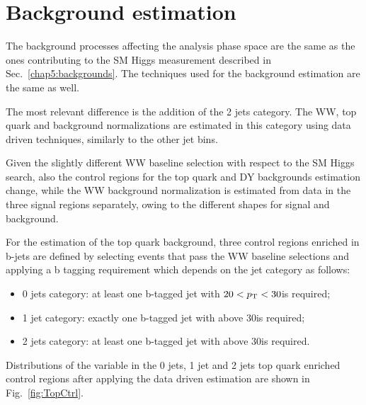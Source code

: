 \section{Background estimation}\label{chap6:Backgrounds}

The background processes affecting the analysis phase space are the same as the ones contributing to the SM Higgs measurement described in Sec.~\ref{chap5:backgrounds}. The techniques used for the background estimation are the same as well.

The most relevant difference is the addition of the 2 jets category. The WW, top quark and \dytt background normalizations are estimated in this category using data driven techniques, similarly to the other jet bins.

Given the slightly different WW baseline selection with respect to the SM Higgs search, also the control regions for the top quark and DY backgrounds estimation change, while the WW background normalization is estimated from data in the three signal regions separately, owing to the different \mti shapes for signal and background.

For the estimation of the top quark background, three control regions enriched in b-jets are defined by selecting events that pass the WW baseline selections and applying a b tagging requirement which depends on the jet category as follows:
\begin{itemize}
\item 0 jets category: at least one b-tagged jet with $20 < p_\mathrm{T} < 30$\GeV is required;
\item 1 jet category: exactly one b-tagged jet with \pt above 30\GeV is required;
\item 2 jets category: at least one b-tagged jet with \pt above 30\GeV is required.
\end{itemize}
Distributions of the \mti variable in the 0 jets, 1 jet and 2 jets top quark enriched control regions after applying the data driven estimation are shown in Fig.~\ref{fig:TopCtrl}.

